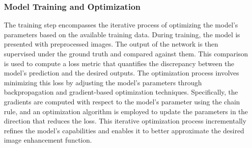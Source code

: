 \documentclass{article}
\begin{document}
\subsubsection{Model Training and Optimization}
The training step encompasses the iterative process of optimizing the model's parameters based on the available training data.
During training, the model is presented with preprocessed images. The output of the network is then supervised under the ground truth and compared against them. This comparison is used to
compute a loss metric that quantifies the discrepancy between the model's prediction and the desired outputs. The optimization
process involves minimizing  this loss by adjusting the model's parameters through backpropagation and gradient-based optimization
techniques. Specifically, the gradients are computed with respect to the model's parameter using the chain rule, and an optimization algorithm
is employed to update the parameters in the direction that reduces the loss. This iterative optimization process incrementally refines
the model's capabilities and enables it to better approximate the desired image enhancement function.


\end{document}
